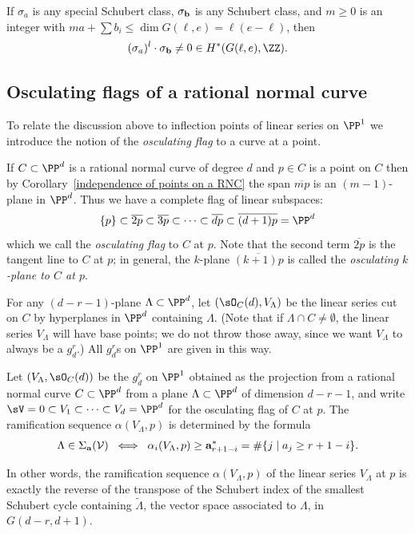 \begin{corollary}\label{intersection with sigma nonzero}
If $\sigma_a$ is any special Schubert class, $\sigma_{\bf b}$ is any Schubert class,
and $m\geq 0$ is an integer with $m a + \sum b_i \leq \dim G(\ell, e) = \ell(e-\ell)$, then   
$$
(\sigma_a)^l \cdot \sigma_{\bf b} \neq 0 \in H^*(G(\ell, e), \ZZ).
$$
\end{corollary}

\subsection{Osculating flags of a rational normal curve}

To relate the discussion above to inflection points of linear series on $\PP^1$ we introduce the notion of the \emph{osculating flag} to a curve at a point.

If $C\subset \PP^d$ is a rational normal curve of degree $d$ and $p \in C$ is a point on $C$ then by Corollary~\ref{independence of points on a RNC} the span $\overline{mp}$ is an $(m-1)$-plane in $\PP^d$.
Thus we have a complete flag of linear subspaces:
$$
\{p\} \subset \overline{2p} \subset \overline{3p} \subset \dots \subset \overline{dp} \subset \overline{(d+1)p} = \PP^d
$$
which we call the \emph{osculating flag} to $C$ at $p$. Note that the second term $\overline{2p}$ is the tangent line to $C$ at $p$; in general, the $k$-plane $\overline{(k+1)p}$ is called the \emph{osculating $k$-plane to $C$ at $p$}.

For any $(d-r-1)$-plane $\Lambda \subset \PP^d$, let $(\sO_C(d), V_\Lambda)$ be the linear series cut on $C$ by hyperplanes in $\PP^d$ containing $\Lambda$. (Note that if $\Lambda \cap C \neq \emptyset$, the linear series $V_\Lambda$ will have base points; we do not throw those away, since we want $V_\Lambda$ to always be a $g^r_d$.) All $g^r_d$s on $\PP^1$ are given in this way.

\begin{proposition}\label{ramification}
Let $(V_\Lambda, \sO_C(d))$ be the $g^r_d$ on $\PP^1$ obtained as the projection from a rational normal curve $C\subset \PP^d$
from a plane $\Lambda \subset \PP^d$ of dimension $d-r-1$, and write $\sV = 0\subset V_1\subset \cdots \subset V_d = \PP^d$ for the osculating flag of $C$ at $p$. The ramification sequence $\alpha(V_\Lambda, p)$
is determined by the formula
%
$$
\Lambda \in \Sigma_{\bf a}({\cal V}) \; \iff \; \alpha_i(V_\Lambda, p) \geq {\bf a}^*_{r+1-i} = \#\{j\mid a_j\geq r+1-i\}.
$$
\end{proposition} 
\def\tL{{\widetilde \Lambda}}
\def\tsV{{\widetilde \sV}}
\def\tV{{\widetilde V}}
In other words, the ramification sequence $\alpha(V_\Lambda, p)$ of the linear series $V_\Lambda$ at $p$ is exactly the reverse of the transpose of the Schubert index of the smallest Schubert cycle containing $\tL$, the vector
space associated to $\Lambda$, in  $G(d-r, d+1)$.


